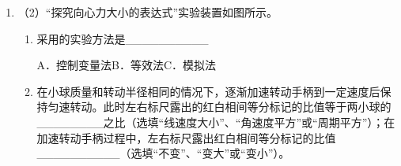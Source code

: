 \documentclass[\gkver]{gaokaozhenti}
\begin{document}
\begin{enumerate}
{B．该实验只要使得小车加速运动即可，不需要倾斜轨道补偿阻力，选项 B 错误；

C．为了充分利用纸带，则小车靠近打点计时器静止释放，选项 C 正确；

D．先接通电源再释放小车，选项 D 正确。故选 ACD。

②计数点 1 的读数为 $2.75\Ucm$。打点周期 $T = 0.02\Us$，则打计数点 2 时小车的速度大小为 $v_{2}=\frac{x_{13}}{2T}=\frac{(8.65-2.75)\times10^{-2}}{0.04}\Ums=1.48\Ums$。
}

\item[]
（2）“探究向心力大小的表达式”实验装置如图所示。
\begin{enumerate}[label=\protect\Circled{\arabic*}]
	\item
	采用的实验方法是\_\_\_\_\_\_\_\_\_\_

	A．控制变量法\qquad B．等效法\qquad C．模拟法
	\item
	在小球质量和转动半径相同的情况下，逐渐加速转动手柄到一定速度后保持匀速转动。此时左右标尺露出的红白相间等分标记的比值等于两小球的\_\_\_\_\_\_\_\_之比（选填“线速度大小”、“角速度平方”或“周期平方”）；在加速转动手柄过程中，左右标尺露出红白相间等分标记的比值\_\_\_\_\_\_\_\_\_\_（选填“不变”、“变大”或“变小”）。
\end{enumerate}


\end{enumerate}
\end{document}
